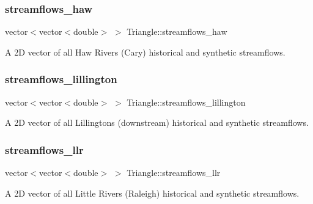 \subsubsection{\texorpdfstring{streamflows\+\_\+haw}{streamflows\_haw}}
{\footnotesize\ttfamily vector$<$vector$<$double$>$ $>$ Triangle\+::streamflows\+\_\+haw\hspace{0.3cm}{\ttfamily [private]}}



A 2D vector of all Haw River\textquotesingle{}s (Cary) historical and synthetic streamflows. 

\mbox{\label{classTriangle_ac69585cb9a4f8a477f030a3d66cea92f}} 
\subsubsection{\texorpdfstring{streamflows\+\_\+lillington}{streamflows\_lillington}}
{\footnotesize\ttfamily vector$<$vector$<$double$>$ $>$ Triangle\+::streamflows\+\_\+lillington\hspace{0.3cm}{\ttfamily [private]}}



A 2D vector of all Lillington\textquotesingle{}s (downstream) historical and synthetic streamflows. 

\mbox{\label{classTriangle_a776794a53c778e47ebe0f8a6b49cd740}} 
\subsubsection{\texorpdfstring{streamflows\+\_\+llr}{streamflows\_llr}}
{\footnotesize\ttfamily vector$<$vector$<$double$>$ $>$ Triangle\+::streamflows\+\_\+llr\hspace{0.3cm}{\ttfamily [private]}}



A 2D vector of all Little River\textquotesingle{}s (Raleigh) historical and synthetic streamflows. 

\mbox{\label{classTriangle_a3426e30cdc767333d491895438bdb00f}} 
